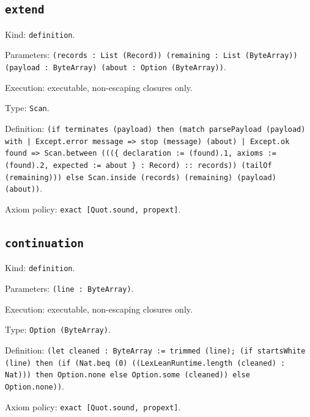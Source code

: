 \documentclass[11pt]{article}
\begin{document}
\subsection*{\texttt{extend}}
\noindent Kind: \texttt{definition}.\par
\noindent Parameters: \texttt{(records : List (Record)) (remaining : List (ByteArray)) (payload : ByteArray) (about : Option (ByteArray))}.\par
\noindent Execution: executable, non-escaping closures only.\par
\noindent Type: \texttt{Scan}.\par
\noindent Definition: \texttt{(if terminates (payload) then (match parsePayload (payload) with | Except.error message => stop (message) (about) | Except.ok found => Scan.between (((\{ declaration := (found).1, axioms := (found).2, expected := about \} : Record) :: records)) (tailOf (remaining))) else Scan.inside (records) (remaining) (payload) (about))}.\par
\noindent Axiom policy: \texttt{exact [Quot.sound, propext]}.\par
\subsection*{\texttt{continuation}}
\noindent Kind: \texttt{definition}.\par
\noindent Parameters: \texttt{(line : ByteArray)}.\par
\noindent Execution: executable, non-escaping closures only.\par
\noindent Type: \texttt{Option (ByteArray)}.\par
\noindent Definition: \texttt{(let cleaned : ByteArray := trimmed (line); (if startsWhite (line) then (if (Nat.beq (0) ((LexLeanRuntime.length (cleaned) : Nat))) then Option.none else Option.some (cleaned)) else Option.none))}.\par
\noindent Axiom policy: \texttt{exact [Quot.sound, propext]}.\par
\end{document}
